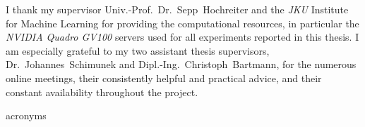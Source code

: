\documentclass[a4paper,oneside,10pt,english]{scrbook}
\DeclareRobustCommand{\acfit}[1]{\textit{\ac{#1}}}
\begin{document}





\cleardoubleoddpage%
\begin{acks*}
	I thank my supervisor Univ.-Prof.\ Dr.~Sepp~Hochreiter and the \acfit{JKU} Institute for Machine Learning for providing the computational resources, in particular the \textit{NVIDIA Quadro GV100} servers used for all experiments reported in this thesis. I am especially grateful to my two assistant thesis supervisors, Dr.~Johannes~Schimunek and Dipl.-Ing.~Christoph~Bartmann, for the numerous online meetings, their consistently helpful and practical advice, and their constant availability throughout the project.
\end{acks*}





\cleardoubleoddpage
\tableofcontents

\cleardoubleoddpage
\listoftables

\cleardoubleoddpage
\listoffigures

\cleardoubleoddpage
\addchap{\acronymname}
{acronyms}
\end{document}
